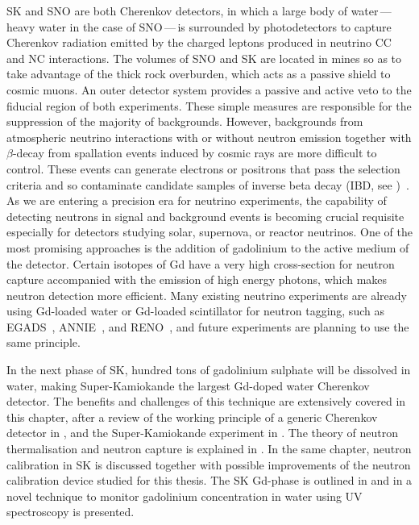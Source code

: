 SK and SNO are both Cherenkov detectors, in which a large body of water\,---\,heavy water in the case of SNO\,---\,is surrounded by %
photodetectors to capture Cherenkov radiation emitted by the charged leptons produced in neutrino CC and NC interactions.
The volumes of SNO and SK are located in mines so as to take advantage of the thick rock overburden, %
which acts as a passive shield to cosmic muons.
An outer detector system provides a passive and active veto to the fiducial region of both experiments.
These simple measures are responsible for the suppression of the majority of backgrounds.
However, backgrounds from atmospheric neutrino interactions with or without neutron emission together %
with $\beta$-decay from spallation events induced by cosmic rays are more difficult to control.
These events can generate electrons or positrons that pass the selection criteria and so contaminate %
candidate samples of inverse beta decay (IBD, see )~\cite{Zhang:2013tua, Super-Kamiokande:2015xra}.
As we are entering a precision era for neutrino experiments, the capability of detecting neutrons %
in signal and background events is becoming crucial requisite
especially for detectors studying solar, supernova, or reactor neutrinos.
One of the most promising approaches is the addition of gadolinium to the active medium of the detector.
Certain isotopes of Gd have a very high cross-section for neutron capture %
accompanied with the emission of high energy photons, which makes neutron detection more efficient.
Many existing neutrino experiments are already using Gd-loaded water or Gd-loaded scintillator for neutron tagging, %
such as EGADS~\cite{Ikeda:2019pcm}, ANNIE~\cite{Back:2019aqi}, and RENO~\cite{Ahn:2010vy}, %
and future experiments are planning to use the same principle.

In the next phase of SK, hundred tons of gadolinium sulphate will be dissolved in water, making %
Super-Kamiokande the largest Gd-doped water Cherenkov detector.	%
The benefits and challenges of this technique are extensively covered in this chapter, %
after a review of the working principle of a generic Cherenkov detector in , %
and the Super-Kamiokande experiment in .
The theory of neutron thermalisation and neutron capture is explained in .
In the same chapter, neutron calibration in SK is discussed together with %
possible improvements of the neutron calibration device studied for this thesis.
The SK Gd-phase is outlined in  and in  %
a novel technique to monitor gadolinium concentration in water using UV spectroscopy is presented.

